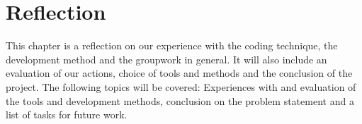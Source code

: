 \chapter{Reflection}
This chapter is a reflection on our experience with the coding technique, the development method and the groupwork in general. It will also include an evaluation of our actions, choice of tools and methods and the conclusion of the project. The following topics will be covered: Experiences with and evaluation of the tools and development methods, conclusion on the problem statement and a list of tasks for future work.
\clearpage




